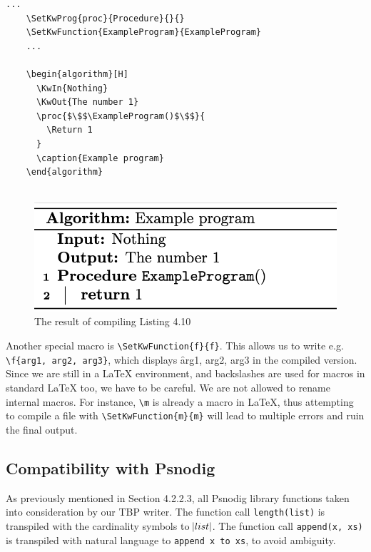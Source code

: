 \begin{lstlisting}[caption={Example program with Algorithm2e to show macros in action}, captionpos=b, frame=trbl]
    ...
    \SetKwProg{proc}{Procedure}{}{}
    \SetKwFunction{ExampleProgram}{ExampleProgram}
    ...
        
    \begin{algorithm}[H]
      \KwIn{Nothing}
      \KwOut{The number 1}
      \proc{$\$$\ExampleProgram()$\$$}{
        \Return 1
      }
      \caption{Example program}
    \end{algorithm}
    
\end{lstlisting}

\begin{figure}[ht]
    \centering
    \includegraphics[scale=0.6]{assets/exampleProgramAlgorithm2e.png}
    \caption{The result of compiling Listing 4.10}
    \label{fig:algorithm2e_mini_example}
\end{figure}

Another special macro is \texttt{\textbackslash SetKwFunction\{f\}\{f\}}. This allows us to write e.g. \texttt{\textbackslash f\{arg1, arg2, arg3\}}, which displays \f{arg1, arg2, arg3} in the compiled version. \hfill \\

Since we are still in a LaTeX environment, and backslashes are used for macros in standard LaTeX too, we have to be careful. We are not allowed to rename internal macros. For instance, \texttt{\textbackslash m} is already a macro in LaTeX, thus attempting to compile a file with \texttt{\textbackslash SetKwFunction\{m\}\{m\}} will lead to multiple errors and ruin the final output.

\subsection{Compatibility with Psnodig}

As previously mentioned in Section 4.2.2.3, all Psnodig library functions taken into consideration by our TBP writer. The function call \texttt{length(list)} is transpiled with the cardinality symbols to \hspace{.01cm} $\abs{list}$. The function call \texttt{append(x, xs)} is transpiled with natural language to \texttt{append x to xs}, to avoid ambiguity. \hfill \\

